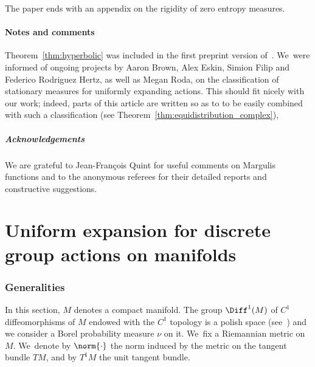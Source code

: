 The paper ends with an appendix on the rigidity of zero entropy measures.\enlargethispage{.5\baselineskip}

\subsection{Notes and comments} Theorem~\ref{thm:hyperbolic} was included in the first preprint version
of~\cite{stiffness}. We~were informed of ongoing projects by Aaron Brown, Alex Eskin,
Simion Filip and Federico Rodriguez Hertz, as well as Megan Roda,
on the classification of stationary measures for uniformly expanding actions.
This should fit nicely with our work; indeed, parts of this article are written so as to to be easily combined with such a classification (see \eg Theorem~\ref{thm:equidistribution_complex}),

\subsubsection*{Acknowledgements}
We are grateful to Jean-François Quint for useful comments on Margulis functions and to
the anonymous referees for their detailed reports and constructive suggestions.

\part{Uniform expansion for discrete group actions on manifolds}

\section{Generalities}\label{sec:uniform_generalities}

In this section, $M$ denotes a compact manifold. The group $\Diff^1(M)$
of $C^1$ diffeomorphisms of $M$ endowed with the $C^1$ topology is a polish space (see~\cite{rosendal:book}) and we consider a Borel
probability measure $\nu$ on it. We~fix a Riemannian metric on $M$. We~denote by $\norm{\cdot}$
the norm induced by the metric on the tangent bundle $TM$, and by $T^1M$ the unit tangent bundle.

